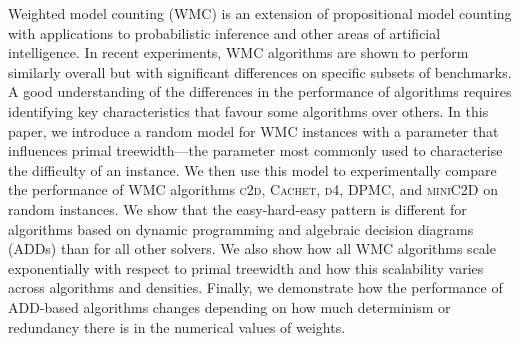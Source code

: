 Weighted model counting (\textsf{WMC}) is an extension of propositional model counting with applications to probabilistic inference and other areas of artificial intelligence. In recent experiments, \textsf{WMC} algorithms are shown to perform similarly overall but with significant differences on specific subsets of benchmarks. A good understanding of the differences in the performance of algorithms requires identifying key characteristics that favour some algorithms over others. In this paper, we introduce a random model for \textsf{WMC} instances with a parameter that influences primal treewidth---the parameter most commonly used to characterise the difficulty of an instance. We then use this model to experimentally compare the performance of \textsf{WMC} algorithms \textsc{c2d}, \textsc{Cachet}, \textsc{d4}, \textsc{DPMC}, and \textsc{miniC2D} on random instances. We show that the easy-hard-easy pattern is different for algorithms based on dynamic programming and algebraic decision diagrams (ADDs) than for all other solvers. We also show how all \textsf{WMC} algorithms scale exponentially with respect to primal treewidth and how this scalability varies across algorithms and densities. Finally, we demonstrate how the performance of ADD-based algorithms changes depending on how much determinism or redundancy there is in the numerical values of weights.
